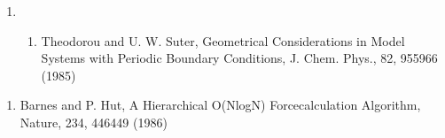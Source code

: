 \documentclass[letterpaper,11pt,english]{sphinxmanual}
\begin{document}
\begin{enumerate}
%
\setcounter{enumi}{3}
\item {} \begin{enumerate}
%
\setcounter{enumii}{13}
\item {} 
Theodorou and U. W. Suter, Geometrical Considerations in Model Systems with Periodic Boundary Conditions, J. Chem. Phys., 82, 955\sphinxhyphen{}966 (1985)

\end{enumerate}

\end{enumerate}
\begin{enumerate}
%
\setcounter{enumi}{9}
\item {} 
Barnes and P. Hut, A Hierarchical O(NlogN) Force\sphinxhyphen{}calculation Algorithm, Nature, 234, 446\sphinxhyphen{}449 (1986)

\end{enumerate}
\end{document}
